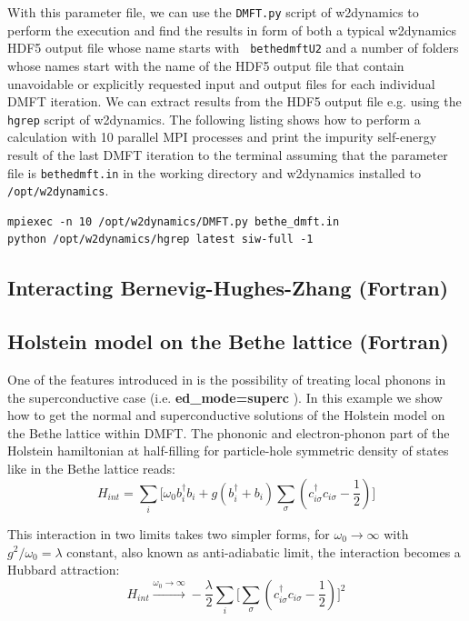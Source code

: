 \documentclass[edipack2.tex]{subfiles}
\begin{document}
With this parameter file, we can use the {\tt DMFT.py} script of
w2dynamics to perform the execution and find the results in form of
both a typical w2dynamics HDF5 output file whose name starts with {\tt
  bethe\textunderscore{}dmft\textunderscore{}U2} and a number of folders whose names start with the
name of the HDF5 output file that contain unavoidable or explicitly
requested \NAME input and output files for each individual DMFT
iteration. We can extract results from the HDF5 output file e.g. using
the {\tt hgrep} script of w2dynamics. The following listing shows how
to perform a calculation with 10 parallel MPI processes and print the
impurity self-energy result of the last DMFT iteration to the terminal
assuming that the parameter file is {\tt bethe\textunderscore{}dmft.in} in the working
directory and w2dynamics installed to {\tt /opt/w2dynamics}.

\begin{lstlisting}[style=mybash]
mpiexec -n 10 /opt/w2dynamics/DMFT.py bethe_dmft.in
python /opt/w2dynamics/hgrep latest siw-full -1
\end{lstlisting}

\subsection{Interacting Bernevig-Hughes-Zhang (Fortran)}

\subsection{Holstein model on the Bethe lattice (Fortran)}

One of the features introduced in \NAME is the possibility of treating local phonons in the superconductive case (i.e. \textbf{ed\_mode=superc} ). In this example we show how to get the normal and superconductive solutions of the Holstein model on the Bethe lattice within DMFT. The phononic and electron-phonon part of the Holstein hamiltonian at half-filling for particle-hole symmetric density of states like in the Bethe lattice reads:
\begin{equation} \label{eqex:H_Holstein}
    H_{int} = \sum_i \Big[\omega_0 b^\dagger_i b_i + g(b^\dagger_i + b_i)\sum_{\sigma}(c^\dagger_{i\sigma}c_{i\sigma} -\frac{1}{2})\Big]
\end{equation}

This interaction in two limits takes two simpler forms, for $\omega_0 \rightarrow \infty$ with $g^2/\omega_0=\lambda$ constant, also known as anti-adiabatic limit, the interaction becomes a Hubbard attraction:
\begin{equation}
    H_{int} \overset{ \omega_0 \rightarrow \infty}{ \longrightarrow } -\frac{\lambda}{2} \sum_i \Big[\sum_\sigma(c^\dagger_{i\sigma}c_{i\sigma} -\frac{1}{2}) \Big]^2
\end{equation}
\end{document}
